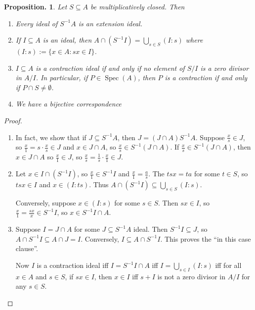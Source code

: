 \documentclass[11pt, a4paper]{memoir}
\theoremstyle{change}
\newtheorem{proposition}[theorem]{Proposition.}
\theoremstyle{plain}
\theoremstyle{nonumberplain}
\newtheorem{proof}{Proof}
\DeclareMathOperator{\Spec}{Spec}
\numberwithin{equation}{section}
\begin{document}
\begin{proposition}
    Let $S\subseteq A$ be multiplicatively closed.
    Then
    \begin{enumerate}[nl,r]
        \item Every ideal of $S^{-1}A$ is an extension ideal.
        \item If $I\subseteq A$ is an ideal, then $A\cap (S^{-1}I)=\bigcup_{s\in S}(I:s)$ where $(I:s):=\{x\in A:sx\in I\}$.
        \item $I\subseteq A$ is a contraction ideal if and only if no element of $S/I$ is a zero divisor in $A/I$.
            In particular, if $P\in\Spec(A)$, then $P$ is a contraction if and only if $P\cap S\neq\emptyset$.
        \item We have a bijective correspondence
            \begin{center}
            \end{center}
    \end{enumerate}
\end{proposition}
\begin{proof}
    \begin{enumerate}[r]
        \item In fact, we show that if $J\subseteq S^{-1}A$, then $J=(J\cap A)S^{-1}A$.
            Suppose $\frac{x}{s}\in J$, so $\frac{x}{1}=s\cdot\frac{x}{s}\in J$ and $x\in J\cap A$, so $\frac{x}{s}\in S^{-1}(J\cap A)$.
            If $\frac{x}{s}\in S^{-1}(J\cap A)$, then $x\in J\cap A$ so $\frac{x}{1}\in J$, so $\frac{x}{s}=\frac{1}{s}\cdot\frac{x}{1}\in J$.
        \item Let $x\in I\cap(S^{-1}I)$, so $\frac{x}{1}\in S^{-1}I$ and $\frac{x}{1}=\frac{a}{s}$.
            The $tsx=ta$ for some $t\in S$, so $tsx\in I$ and $x\in(I:ts)$.
            Thus $A\cap (S^{-1}I)\subseteq\bigcup_{s\in S}(I:s)$.

            Conversely, suppose $x\in(I:s)$ for some $s\in S$.
            Then $sx\in I$, so $\frac{x}{1}=\frac{sx}{x}\in S^{-1}I$, so $x\in S^{-1}I\cap A$.
        \item Suppose $I=J\cap A$ for some $J\subseteq S^{-1}A$ ideal.
            Then $S^{-1}I\subseteq J$, so $A\cap S^{-1}I\subseteq A\cap J=I$.
            Conversely, $I\subseteq A\cap S^{-1}I$.
            This proves the ``in this case clause''.

            Now $I$ is a contraction ideal iff $I=S^{-1}I\cap A$ iff $I=\bigcup_{s\in I}(I:s)$ iff for all $x\in A$ and $s\in S$, if $sx\in I$, then $x\in I$ iff $s+I$ is not a zero divisor in $A/I$ for any $s\in S$.
    \end{enumerate}
\end{proof}
\end{document}
